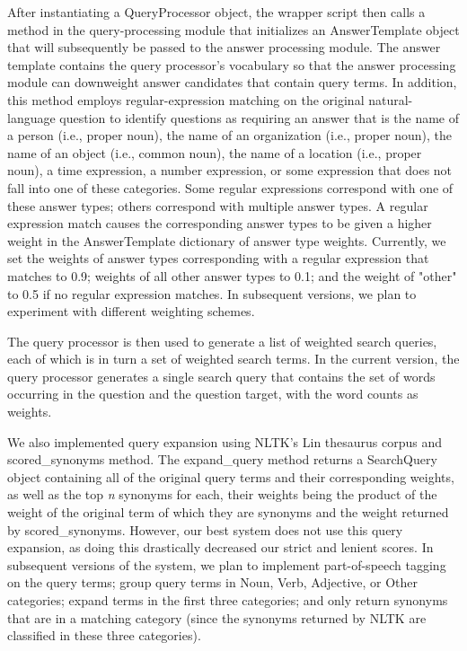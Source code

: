 \documentclass[11pt]{article}
\begin{document}
After instantiating a QueryProcessor object, the wrapper script then calls a method in the query-processing module that initializes an AnswerTemplate object that will subsequently be passed to the answer processing module. The answer template contains the query processor's vocabulary so that the answer processing module can downweight answer candidates that contain query terms. In addition, this method employs regular-expression matching on the original natural-language question to identify questions as requiring an answer that is the name of a person (i.e., proper noun), the name of an organization (i.e., proper noun), the name of an object (i.e., common noun), the name of a location (i.e., proper noun), a time expression, a number expression, or some expression that does not fall into one of these categories. Some regular expressions correspond with one of these answer types; others correspond with multiple answer types. A regular expression match causes the corresponding answer types to be given a higher weight in the AnswerTemplate dictionary of answer type weights. Currently, we set the weights of answer types corresponding with a regular expression that matches to 0.9; weights of all other answer types to 0.1; and the weight of "other" to 0.5 if no regular expression matches. In subsequent versions, we plan to experiment with different weighting schemes.

The query processor is then used to generate a list of weighted search queries, each of which is in turn a set of weighted search terms. In the current version, the query processor generates a single search query that contains the set of words occurring in the question and the question target, with the word counts as weights.

We also implemented query expansion using NLTK's Lin thesaurus corpus and scored\_synonyms method. The expand\_query method returns a SearchQuery object containing all of the original query terms and their corresponding weights, as well as the top \emph{n} synonyms for each, their weights being the product of the weight of the original term of which they are synonyms and the weight returned by scored\_synonyms. However, our best system does not use this query expansion, as doing this drastically decreased our strict and lenient scores. In subsequent versions of the system, we plan to implement part-of-speech tagging on the query terms; group query terms in Noun, Verb, Adjective, or Other categories; expand terms in the first three categories; and only return synonyms that are in a matching category (since the synonyms returned by NLTK are classified in these three categories).
\end{document}
